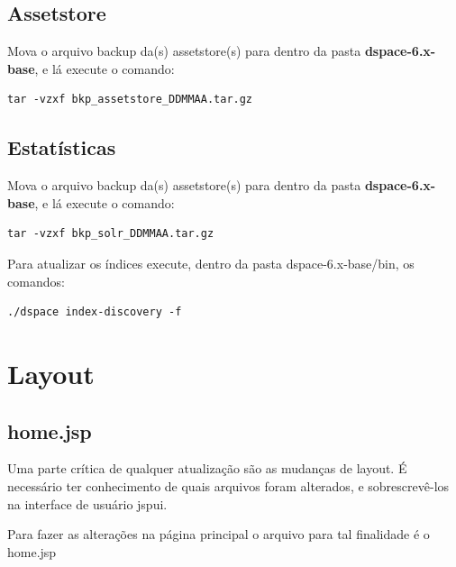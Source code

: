 \documentclass[12pt,hidelinks]{article}
\begin{document}
\newpage
\subsection{Assetstore}

\textbullet \hspace{6pt} Mova o arquivo backup da(s) assetstore(s) para dentro da pasta \textbf{dspace-6.x-base}, e lá execute o comando:

\begin{verbatim}
tar -vzxf bkp_assetstore_DDMMAA.tar.gz
\end{verbatim}

\subsection{Estatísticas}

\textbullet \hspace{6pt} Mova o arquivo backup da(s) assetstore(s) para dentro da pasta \textbf{dspace-6.x-base}, e lá execute o comando:

\begin{verbatim}
tar -vzxf bkp_solr_DDMMAA.tar.gz
\end{verbatim}

Para atualizar os índices execute, dentro da pasta dspace-6.x-base/bin, os comandos:
\begin{verbatim}
./dspace index-discovery -f
\end{verbatim}

\newpage
\section{Layout}
\newpage

\subsection{home.jsp}

Uma parte crítica de qualquer atualização são as mudanças de layout. É necessário ter conhecimento de quais arquivos foram alterados, e sobrescrevê-los na interface de usuário jspui. 

Para fazer as alterações na página principal o arquivo para tal finalidade é o home.jsp
\end{document}
